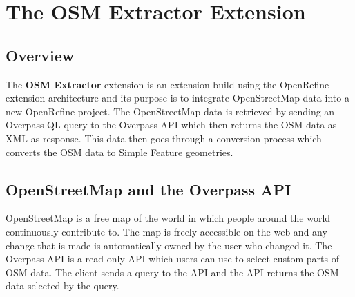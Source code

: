 \chapter{The OSM Extractor Extension}\label{ch:the-osm-extractor-extension}
\section{Overview}
The \textbf{OSM Extractor} extension is an extension build using the OpenRefine extension architecture and its purpose
is to integrate OpenStreetMap data into a new OpenRefine project.
The OpenStreetMap data is retrieved by sending an Overpass QL query to the Overpass API which then
returns the OSM data as XML as response.
This data then goes through a conversion process which converts the OSM data to Simple Feature geometries.
\section{OpenStreetMap and the Overpass API}
OpenStreetMap is a free map of the world in which people around the world continuously contribute to.
The map is freely accessible on the web and any change that is made is automatically owned by the user who changed it.
The Overpass API is a read-only API which users can use to select custom parts of OSM data.
The client sends a query to the API and the API returns the OSM data selected by the query.
